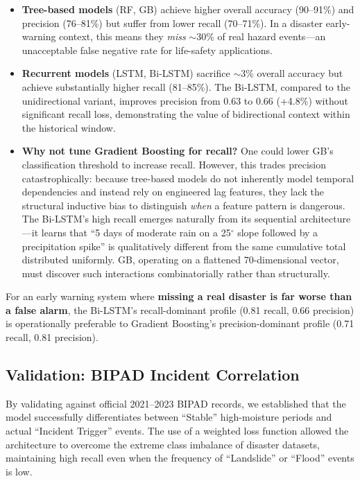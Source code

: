 \documentclass[journal,twoside]{IEEEtran}
\begin{document}
\begin{itemize}
    \item \textbf{Tree-based models} (RF, GB) achieve higher overall accuracy (90--91\%) and precision (76--81\%) but suffer from lower recall (70--71\%). In a disaster early-warning context, this means they \textit{miss} $\sim$30\% of real hazard events---an unacceptable false negative rate for life-safety applications.
    \item \textbf{Recurrent models} (LSTM, Bi-LSTM) sacrifice $\sim$3\% overall accuracy but achieve substantially higher recall (81--85\%). The Bi-LSTM, compared to the unidirectional variant, improves precision from 0.63 to 0.66 (+4.8\%) without significant recall loss, demonstrating the value of bidirectional context within the historical window.
    \item \textbf{Why not tune Gradient Boosting for recall?} One could lower GB's classification threshold to increase recall. However, this trades precision catastrophically: because tree-based models do not inherently model temporal dependencies and instead rely on engineered lag features, they lack the structural inductive bias to distinguish \textit{when} a feature pattern is dangerous. The Bi-LSTM's high recall emerges naturally from its sequential architecture---it learns that ``5 days of moderate rain on a 25$^\circ$ slope followed by a precipitation spike'' is qualitatively different from the same cumulative total distributed uniformly. GB, operating on a flattened 70-dimensional vector, must discover such interactions combinatorially rather than structurally.
\end{itemize}

For an early warning system where \textbf{missing a real disaster is far worse than a false alarm}, the Bi-LSTM's recall-dominant profile (0.81 recall, 0.66 precision) is operationally preferable to Gradient Boosting's precision-dominant profile (0.71 recall, 0.81 precision).

\subsection{Validation: BIPAD Incident Correlation}
By validating against official 2021--2023 BIPAD records, we established that the model successfully differentiates between ``Stable'' high-moisture periods and actual ``Incident Trigger'' events. The use of a weighted loss function allowed the architecture to overcome the extreme class imbalance of disaster datasets, maintaining high recall even when the frequency of ``Landslide'' or ``Flood'' events is low.
\end{document}
